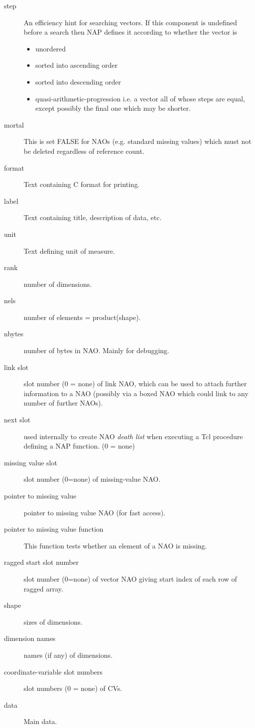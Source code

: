 \begin{description}
    \item[step]
    An efficiency hint for searching vectors. If this component is
    undefined before a search then NAP defines it according to whether
    the vector is
    \begin{itemize}
      \item unordered
      \item sorted into ascending order
      \item sorted into descending order
      \item quasi-arithmetic-progression i.e. a vector all of whose steps
      are equal, except possibly the final one which may be
      shorter.
    \end{itemize}
    \item[mortal]
    This is set FALSE for NAOs (e.g. standard missing values) which
    must not be deleted regardless of reference count.
    \item[format]
    Text containing C format for printing.
    \item[label]
    Text containing title, description of data, etc.
    \item[unit]
    Text defining unit of measure.
    \item[rank]
    number of dimensions.
    \item[nels]
    number of elements = product(shape).
    \item[nbytes]
    number of bytes in NAO. Mainly for debugging.
    \item[link slot]
    slot number (0 = none) of link NAO, which can be used to attach
    further information to a NAO (possibly via a boxed NAO which could
    link to any number of further NAOs).
    \item[next slot]
    used internally to create NAO 
    \emph{death list} when executing a Tcl procedure defining a NAP
    function. (0 = none)
    \item[missing value slot]
    slot number (0=none) of missing-value NAO.
    \item[pointer to missing value]
    pointer to missing value NAO (for fast access).
    \item[pointer to missing value function]
    This function tests whether an element of a NAO is
    missing.
    \item[ragged start slot number]
    slot number (0=none) of vector NAO giving start index of each
    row of ragged array.
    \item[shape]
    sizes of dimensions.
    \item[dimension names]
    names (if any) of dimensions.
    \item[coordinate-variable slot numbers]
    slot numbers (0 = none) of CVs.
    \item[data]
    Main data.
  \end{description}

